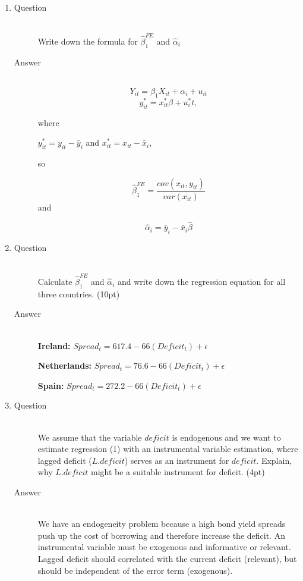 \documentclass{article}
\begin{document}
\begin{enumerate}
  \item
  \begin{description}
    \item[Question] \hfill \\
    Write down the formula for \(\hat{\beta}^{FE}_1\) and \(\hat{\alpha}_i\) 
    \item[Answer] \hfill \\
    \[ Y_{it} = \beta_{1}X_{it} + \alpha_{i} + u_{it} \]
    \[ y^{*}_{it} = x^{*}_{it}\beta + u^{*}_it, \]
    
    where 
    
    \null
    
    \(y^{*}_{it} = y_{it} - \bar{y}_{i} \) and \(x^{*}_{it} = x_{it} - \bar{x}_{i}, \)
    
    \null 
    so 
    
    \[\hat{\beta}^{FE}_1 = \frac{cov(x_{it},y_{it})}{var(x_{it})} \] and
    
    \[ \hat{\alpha}_i = \bar{y}_{i} - \bar{x}_{i}\hat{\beta} \]
    
  \end{description}
  
  \item
  \begin{description}
    \item[Question] \hfill \\
    Calculate \(\hat{\beta}^{FE}_1\) and \(\hat{\alpha}_i\) and write down the regression equation for all three countries. (10pt)
    \item[Answer] \hfill \\
    
    \textbf{Ireland:} \( Spread_{t} = 617.4 -66(Deficit_{t}) + \epsilon \)
    
    \textbf{Netherlands:} \( Spread_{t} = 76.6 -66(Deficit_{t}) + \epsilon \)
    
    \textbf{Spain:} \( Spread_{t} = 272.2 -66(Deficit_{t}) + \epsilon \)
    
  \end{description}
  
  \item
  \begin{description}
    \item[Question] \hfill \\
    We assume that the variable \(deficit\) is endogenous and we want to estimate regression (1) with an instrumental variable estimation, where lagged deficit (\(L.deficit\)) serves as an instrument for \(deficit\). Explain, why \(L.deficit\) might be a suitable instrument for deficit. (4pt)
    \item[Answer] \hfill \\
    We have an endogeneity problem because a high bond yield spreads push up the cost of borrowing and therefore increase the deficit. An instrumental variable must be exogenous and informative or relevant. Lagged deficit should correlated with the current deficit (relevant), but should be independent of the error term (exogenous).
    

\end{description}
\end{enumerate}
\end{document}
